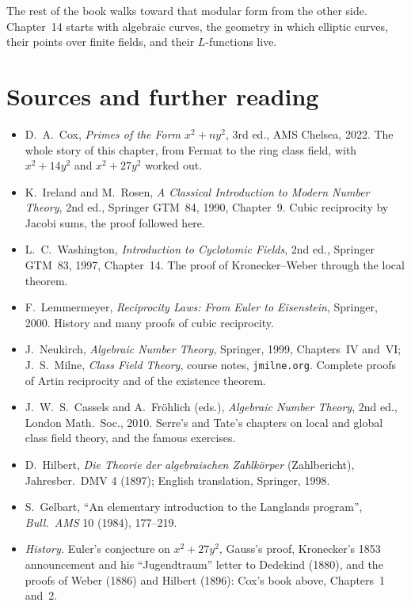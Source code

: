 The rest of the book walks toward that modular form from the other side. Chapter~14 starts with algebraic curves, the geometry in
which elliptic curves, their points over finite fields, and their $L$-functions live.

\section*{Sources and further reading}

\begin{itemize}
\item D.~A.~Cox, \emph{Primes of the Form $x^2+ny^2$}, 3rd ed., AMS Chelsea, 2022. The whole story of this chapter, from Fermat to the ring class
field, with $x^2+14y^2$ and $x^2+27y^2$ worked out.
\item K.~Ireland and M.~Rosen, \emph{A Classical Introduction to Modern Number Theory}, 2nd ed., Springer GTM~84, 1990, Chapter~9. Cubic reciprocity
by Jacobi sums, the proof followed here.
\item L.~C.~Washington, \emph{Introduction to Cyclotomic Fields}, 2nd ed., Springer GTM~83, 1997, Chapter~14. The proof of Kronecker--Weber through
the local theorem.
\item F.~Lemmermeyer, \emph{Reciprocity Laws: From Euler to Eisenstein}, Springer, 2000. History and many proofs of cubic reciprocity.
\item J.~Neukirch, \emph{Algebraic Number Theory}, Springer, 1999, Chapters~IV and~VI; J.~S.~Milne, \emph{Class Field Theory}, course notes,
\texttt{jmilne.org}. Complete proofs of Artin reciprocity and of the existence theorem.
\item J.~W.~S.~Cassels and A.~Fr\"ohlich (eds.), \emph{Algebraic Number Theory}, 2nd ed., London Math.\ Soc., 2010. Serre's and Tate's chapters on
local and global class field theory, and the famous exercises.
\item D.~Hilbert, \emph{Die Theorie der algebraischen Zahlk\"orper} (Zahlbericht), Jahresber.\ DMV 4 (1897); English translation, Springer, 1998.
\item S.~Gelbart, ``An elementary introduction to the Langlands program'', \emph{Bull.\ AMS} 10 (1984), 177--219.
\item \emph{History.} Euler's conjecture on $x^2+27y^2$, Gauss's proof, Kronecker's 1853 announcement and his
``Jugendtraum'' letter to Dedekind (1880), and the proofs of Weber (1886) and Hilbert (1896): Cox's book above, Chapters~1 and~2.
\end{itemize}
